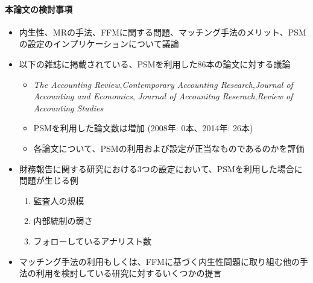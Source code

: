 \paragraph{本論文の検討事項}
\begin{itemize}
 \item 内生性、MRの手法、FFMに関する問題、マッチング手法のメリット、PSMの設定のインプリケーションについて議論
 \item 以下の雑誌に掲載されている、PSMを利用した86本の論文に対する議論
       \begin{itemize}
        \item \textit{The Accounting Review},\textit{Contemporary Accounting Research},\textit{Journal of Accounting and Economics},
              \textit{Journal of Accounitng Reserach},\textit{Review of Accounting Studies}
        \item PSMを利用した論文数は増加 (2008年: 0本、2014年: 26本)
        \item 各論文について、PSMの利用および設定が正当なものであるのかを評価
       \end{itemize}
 \item 財務報告に関する研究における3つの設定において、PSMを利用した場合に問題が生じる例
       \begin{enumerate}
        \item 監査人の規模
        \item 内部統制の弱さ
        \item フォローしているアナリスト数
       \end{enumerate}
 \item マッチング手法の利用もしくは、FFMに基づく内生性問題に取り組む他の手法の利用を検討している研究に対するいくつかの提言
\end{itemize}

